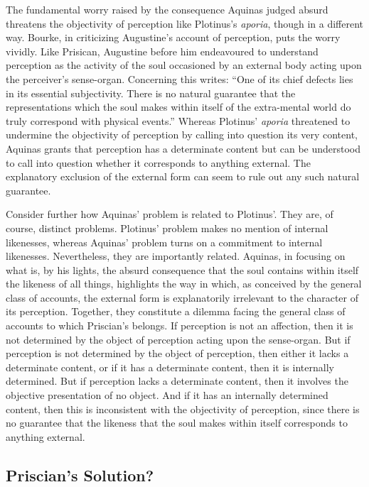 \documentclass[12pt]{article}
\begin{document}
The fundamental worry raised by the consequence Aquinas judged absurd threatens the objectivity of perception like Plotinus's \emph{aporia}, though in a different way. Bourke, in criticizing Augustine's account of perception, puts the worry vividly. Like Prisican, Augustine before him endeavoured to understand perception as the activity of the soul occasioned by an external body acting upon the perceiver's sense-organ. Concerning this \citet[112]{Bourke:1947jk} writes: ``One of its chief defects lies in its essential subjectivity. There is no natural guarantee that the representations which the soul makes within itself of the extra-mental world do truly correspond with physical events.'' Whereas Plotinus' \emph{aporia} threatened to undermine the objectivity of perception by calling into question its very content, Aquinas grants that perception has a determinate content but can be understood to call into question whether it corresponds to anything external. The explanatory exclusion of the external form can seem to rule out any such natural guarantee.

Consider further how Aquinas' problem is related to Plotinus'. They are, of course, distinct problems. Plotinus' problem makes no mention of internal likenesses, whereas Aquinas' problem turns on a commitment to internal likenesses. Nevertheless, they are importantly related. Aquinas, in focusing on what is, by his lights, the absurd consequence that the soul contains within itself the likeness of all things, highlights the way in which, as conceived by the general class of accounts, the external form is explanatorily irrelevant to the character of its perception. Together, they constitute a dilemma facing the general class of accounts to which Priscian's belongs. If perception is not an affection, then it is not determined by the object of perception acting upon the sense-organ. But if perception is not determined by the object of perception, then either it lacks a determinate content, or if it has a determinate content, then it is internally determined. But if perception lacks a determinate content, then it involves the objective presentation of no object. And if it has an internally determined content, then this is inconsistent with the objectivity of perception, since there is no guarantee that the likeness that the soul makes within itself corresponds to anything external.



\subsection{Priscian's Solution?} %
\label{sec:_ldots_and_priscian_s_solution}
\end{document}
